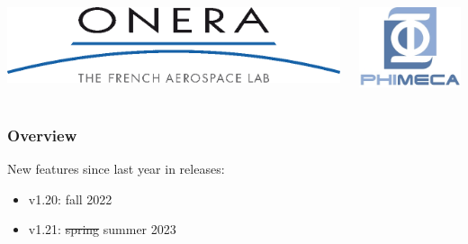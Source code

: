 \documentclass[aspectratio=169]{beamer}
\begin{document}
\begin{frame}
\begin{columns}
  \begin{center}
\includegraphics[height=0.05\textheight]{figures/onera-logo.png}
\end{center}

  \begin{center}
\includegraphics[height=0.08\textheight]{figures/logo-phimeca.png}
\end{center}


  \end{columns}

  \end{frame}

\begin{frame}
\frametitle{Overview}

New features since last year in releases:

\begin{itemize}
\item v1.20: fall 2022
\item v1.21: \sout{spring} summer 2023
\end{itemize}

\end{frame}
  


\end{document}

